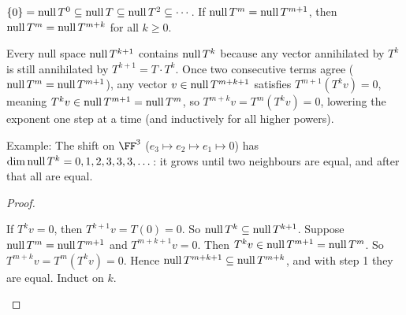 \documentclass[10pt]{scrartcl}
\begin{document}
\begin{proposition*}\hypertarget{prop-69}{}\label{prop-69}
  $\{0\}=\operatorname{null} T^0\subseteq\operatorname{null} T\subseteq\operatorname{null} T^2\subseteq\cdots$. If $\operatorname{null} T^m=\operatorname{null} T^{m+1}$, then $\operatorname{null} T^m=\operatorname{null} T^{m+k}$ for all $k\ge0$.
\end{proposition*}
\begin{ideabox}
Every null space $\operatorname{null} T^{k+1}$ contains $\operatorname{null} T^k$ because any vector annihilated by $T^k$ is still annihilated by $T^{k+1}=T\cdot T^k$. Once two consecutive terms agree ($\operatorname{null} T^m=\operatorname{null} T^{m+1}$), any vector $v\in\operatorname{null} T^{m+k+1}$ satisfies $T^{m+1}(T^kv)=0$, meaning $T^kv\in\operatorname{null} T^{m+1}=\operatorname{null} T^m$, so $T^{m+k}v=T^m(T^kv)=0$, lowering the exponent one step at a time (and inductively for all higher powers).

Example: The shift on $\FF^3$ ($e_3\mapsto e_2\mapsto e_1\mapsto0$) has $\dim\operatorname{null} T^k=0,1,2,3,3,3,\dots$: it grows until two neighbours are equal, and after that all are equal.
\end{ideabox}
\begin{proof}
  \begin{steps}
    \ii If $T^kv=0$, then $T^{k+1}v=T(0)=0$. So $\operatorname{null} T^k\subseteq\operatorname{null} T^{k+1}$.
    \ii Suppose $\operatorname{null} T^m=\operatorname{null} T^{m+1}$ and $T^{m+k+1}v=0$. Then $T^kv\in\operatorname{null} T^{m+1}=\operatorname{null} T^m$.
    \ii So $T^{m+k}v=T^m(T^kv)=0$. Hence $\operatorname{null} T^{m+k+1}\subseteq\operatorname{null} T^{m+k}$, and with step 1 they are equal. Induct on $k$.
  \end{steps}
\end{proof}
\end{document}
